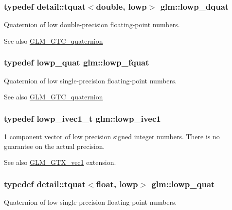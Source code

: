 \subsubsection[{\texorpdfstring{lowp\+\_\+dquat}{lowp_dquat}}]{\setlength{\rightskip}{0pt plus 5cm}typedef {\bf detail\+::tquat}$<$double, lowp$>$ {\bf glm\+::lowp\+\_\+dquat}}\hypertarget{namespaceglm_ad5f207f07b36f4ebd98338c21b92062e}{}\label{namespaceglm_ad5f207f07b36f4ebd98338c21b92062e}
Quaternion of low double-\/precision floating-\/point numbers.

\begin{DoxySeeAlso}{See also}
\hyperlink{group__gtc__quaternion}{G\+L\+M\+\_\+\+G\+T\+C\+\_\+quaternion} 
\end{DoxySeeAlso}
\subsubsection[{\texorpdfstring{lowp\+\_\+fquat}{lowp_fquat}}]{\setlength{\rightskip}{0pt plus 5cm}typedef {\bf lowp\+\_\+quat} {\bf glm\+::lowp\+\_\+fquat}}\hypertarget{namespaceglm_aad1f5b3c348c223fb36e28f646552cff}{}\label{namespaceglm_aad1f5b3c348c223fb36e28f646552cff}
Quaternion of low single-\/precision floating-\/point numbers.

\begin{DoxySeeAlso}{See also}
\hyperlink{group__gtc__quaternion}{G\+L\+M\+\_\+\+G\+T\+C\+\_\+quaternion} 
\end{DoxySeeAlso}
\subsubsection[{\texorpdfstring{lowp\+\_\+ivec1}{lowp_ivec1}}]{\setlength{\rightskip}{0pt plus 5cm}typedef {\bf lowp\+\_\+ivec1\+\_\+t} {\bf glm\+::lowp\+\_\+ivec1}}\hypertarget{namespaceglm_a5d781b915bec50a9d5b5383835035533}{}\label{namespaceglm_a5d781b915bec50a9d5b5383835035533}
1 component vector of low precision signed integer numbers. There is no guarantee on the actual precision. \begin{DoxySeeAlso}{See also}
\hyperlink{group__gtx__vec1}{G\+L\+M\+\_\+\+G\+T\+X\+\_\+vec1} extension. 
\end{DoxySeeAlso}
\subsubsection[{\texorpdfstring{lowp\+\_\+quat}{lowp_quat}}]{\setlength{\rightskip}{0pt plus 5cm}typedef {\bf detail\+::tquat}$<$float, lowp$>$ {\bf glm\+::lowp\+\_\+quat}}\hypertarget{namespaceglm_aefc1d896fa40939955d68b2c68c33cc8}{}\label{namespaceglm_aefc1d896fa40939955d68b2c68c33cc8}
Quaternion of low single-\/precision floating-\/point numbers.

